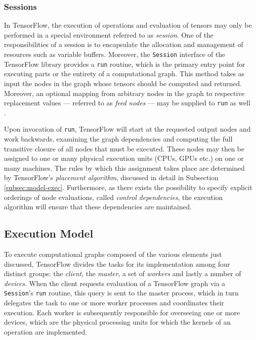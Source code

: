 \subsubsection{Sessions}\label{sec:model-graphs-sessions}

In TensorFlow, the execution of operations and evaluation of tensors may only be
performed in a special environment referred to as \emph{session}. One of the
responsibilities of a session is to encapsulate the allocation and management of
resources such as variable buffers. Moreover, the \texttt{Session} interface of
the TensorFlow library provides a \texttt{run} routine, which is the primary
entry point for executing parts or the entirety of a computational graph. This
method takes as input the nodes in the graph whose tensors should be computed
and returned. Moreover, an optional mapping from arbitrary nodes in the graph to
respective replacement values --- referred to as \emph{feed nodes} --- may be
supplied to \texttt{run} as well \cite{tensorflow}.

Upon invocation of \texttt{run}, TensorFlow will start at the requested output
nodes and work backwards, examining the graph dependencies and computing the
full transitive closure of all nodes that must be executed. These nodes may then
be assigned to one or many physical execution units (CPUs, GPUs etc.) on one or
many machines. The rules by which this assignment takes place are determined by
TensorFlow's \emph{placement algorithm}, discussed in detail in Subsection
\ref{subsec:model-exec}. Furthermore, as there exists the possibility to specify
explicit orderings of node evaluations, called \emph{control dependencies}, the
execution algorithm will ensure that these dependencies are maintained.

\subsection{Execution Model}\label{sec:model-exec}

To execute computational graphs composed of the various elements just discussed,
TensorFlow divides the tasks for its implementation among four distinct groups:
the \emph{client}, the \emph{master}, a set of \emph{workers} and lastly a
number of \emph{devices}. When the client requests evaluation of a TensorFlow
graph via a \texttt{Session}'s \texttt{run} routine, this query is sent to the
master process, which in turn delegates the task to one or more worker processes
and coordinates their execution. Each worker is subsequently responsible for
overseeing one or more devices, which are the physical processing units for
which the kernels of an operation are implemented.

